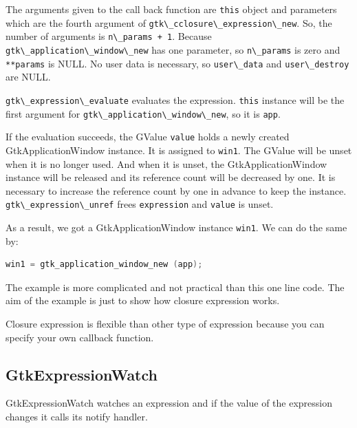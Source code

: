 The arguments given to the call back function are
\passthrough{\lstinline!this!} object and parameters which are the
fourth argument of
\passthrough{\lstinline!gtk\_cclosure\_expression\_new!}. So, the number
of arguments is \passthrough{\lstinline!n\_params + 1!}. Because
\passthrough{\lstinline!gtk\_application\_window\_new!} has one
parameter, so \passthrough{\lstinline!n\_params!} is zero and
\passthrough{\lstinline!**params!} is NULL. No user data is necessary,
so \passthrough{\lstinline!user\_data!} and
\passthrough{\lstinline!user\_destroy!} are NULL.

\passthrough{\lstinline!gtk\_expression\_evaluate!} evaluates the
expression. \passthrough{\lstinline!this!} instance will be the first
argument for \passthrough{\lstinline!gtk\_application\_window\_new!}, so
it is \passthrough{\lstinline!app!}.

If the evaluation succeeds, the GValue \passthrough{\lstinline!value!}
holds a newly created GtkApplicationWindow instance. It is assigned to
\passthrough{\lstinline!win1!}. The GValue will be unset when it is no
longer used. And when it is unset, the GtkApplicationWindow instance
will be released and its reference count will be decreased by one. It is
necessary to increase the reference count by one in advance to keep the
instance. \passthrough{\lstinline!gtk\_expression\_unref!} frees
\passthrough{\lstinline!expression!} and \passthrough{\lstinline!value!}
is unset.

As a result, we got a GtkApplicationWindow instance
\passthrough{\lstinline!win1!}. We can do the same by:

\begin{lstlisting}[language=C]
win1 = gtk_application_window_new (app);
\end{lstlisting}

The example is more complicated and not practical than this one line
code. The aim of the example is just to show how closure expression
works.

Closure expression is flexible than other type of expression because you
can specify your own callback function.

\hypertarget{gtkexpressionwatch}{%
\subsection{GtkExpressionWatch}\label{gtkexpressionwatch}}

GtkExpressionWatch watches an expression and if the value of the
expression changes it calls its notify handler.

